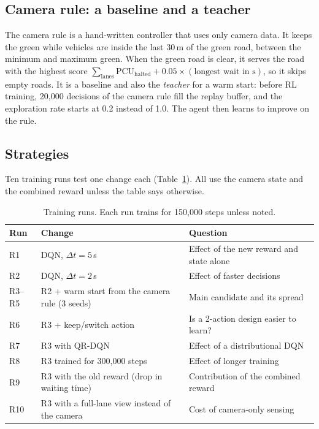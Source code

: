 \subsection{Camera rule: a baseline and a teacher}
The camera rule is a hand-written controller that uses only camera data. It keeps the green while
vehicles are inside the last 30\,m of the green road, between the minimum and maximum green. When
the green road is clear, it serves the road with the highest score
$\sum_{\text{lanes}} \mathrm{PCU}_{\text{halted}} + 0.05\times(\text{longest wait in s})$,
so it skips empty roads. It is a baseline and also the \emph{teacher} for a warm start: before RL
training, 20{,}000 decisions of the camera rule fill the replay buffer, and the exploration rate
starts at 0.2 instead of 1.0. The agent then learns to improve on the rule.

\subsection{Strategies}
Ten training runs test one change each (Table~\ref{tab:strategies}). All use the camera state and
the combined reward unless the table says otherwise.

\begin{table}[H]
\centering\small
\begin{tabular}{lll}
\toprule
Run & Change & Question \\
\midrule
R1 & DQN, $\Delta t=5$\,s & Effect of the new reward and state alone \\
R2 & DQN, $\Delta t=2$\,s & Effect of faster decisions \\
R3--R5 & R2 + warm start from the camera rule (3 seeds) & Main candidate and its spread \\
R6 & R3 + keep/switch action & Is a 2-action design easier to learn? \\
R7 & R3 with QR-DQN & Effect of a distributional DQN \\
R8 & R3 trained for 300{,}000 steps & Effect of longer training \\
R9 & R3 with the old reward (drop in waiting time) & Contribution of the combined reward \\
R10 & R3 with a full-lane view instead of the camera & Cost of camera-only sensing \\
\bottomrule
\end{tabular}
\caption{Training runs. Each run trains for 150{,}000 steps unless noted.}
\label{tab:strategies}
\end{table}

